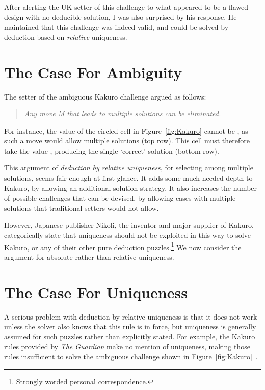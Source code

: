 \documentclass{gapd}
\begin{document}
After alerting the UK setter of this challenge to what appeared to be
a flawed design with no deducible solution, I was also surprised by
his response.  He maintained that this challenge was indeed valid, and
could be solved by deduction based on \textit{relative} uniqueness.

\section{The Case For Ambiguity}
\label{sec:Ambiguity}

The setter of the ambiguous Kakuro challenge argued as follows:

\begin{quote}\itshape
  Any move M that leads to multiple solutions can be eliminated.
\end{quote}

For instance, the value of the circled cell in Figure~\ref{fig:Kakuro}
cannot be {}, as such a move would allow multiple solutions (top
row).  This cell must therefore take the value {}, producing the
single `correct' solution (bottom row).

This argument of \textit{deduction by relative uniqueness}, for selecting
among multiple solutions, seems fair enough at first glance.  It adds
some much-needed depth to Kakuro, by allowing an additional solution
strategy.  It also increases the number of possible challenges that
can be devised, by allowing cases with multiple solutions that
traditional setters would not allow.

However, Japanese publisher Nikoli, the inventor and major supplier of
Kakuro, categorically state that uniqueness should not be exploited in
this way to solve Kakuro, or any of their other pure deduction
puzzles.\footnote{Strongly worded personal correspondence.}  We now
consider the argument for absolute rather than relative uniqueness.

\section{The Case For Uniqueness}
\label{sec:Uniqueness}

A serious problem with deduction by relative uniqueness is that it
does not work unless the solver also knows that this rule is in force,
but uniqueness is generally assumed for such puzzles rather than
explicitly stated.  For example, the Kakuro rules provided by \textit{The
  Guardian} make no mention of uniqueness, making those rules
insufficient to solve the ambiguous challenge shown in
Figure~\ref{fig:Kakuro}~\cite{guardian}.
\end{document}
